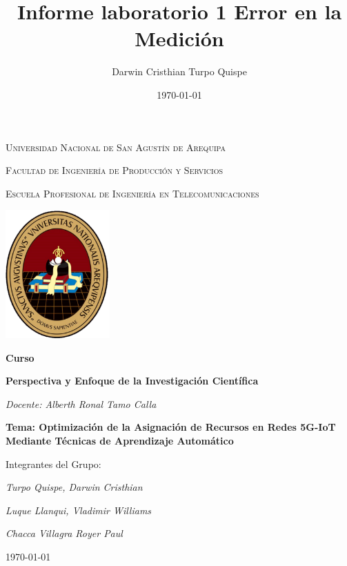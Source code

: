 \documentclass[12pt,a4paper]{article}
\title{\textbf{Informe laboratorio 1 Error en la Medición}}
\author{Darwin Cristhian Turpo Quispe}
\date{\today}
\begin{document}
\begin{titlepage}
  \centering
  {\scshape\LARGE Universidad Nacional de San Agustín de Arequipa\par}
  {\scshape\Large Facultad de Ingeniería de Producción y Servicios\par}
  {\scshape\Large Escuela Profesional de Ingeniería en Telecomunicaciones \par}
  \vspace{1cm}
  \includegraphics[width=0.3\textwidth]{Escudo_UNSA.png}\par\vspace{1cm}
  
  
  \vspace{0.5cm}
  {\Large\bfseries Curso \par}
  {\Large\bfseries Perspectiva y Enfoque de la Investigación Científica \par}
  \vspace{0.5cm}
  {\Large\itshape Docente: Alberth Ronal Tamo Calla\par}
  \vspace{0.5cm}
  \vspace{0.5cm}
  {\Large\bfseries Tema: Optimización de la Asignación de Recursos en Redes 5G-IoT Mediante Técnicas de Aprendizaje Automático \par}
  \vspace{1cm}
  Integrantes del Grupo:\par
  \vspace{0.5cm}
  {\Large\itshape Turpo Quispe, Darwin Cristhian \par}
  {\Large\itshape Luque Llanqui, Vladimir Williams \par}
  {\Large\itshape Chacca Villagra Royer Paul \par}
  \vspace{1cm}
  {\large \today \par}
\end{titlepage}
\end{document}
